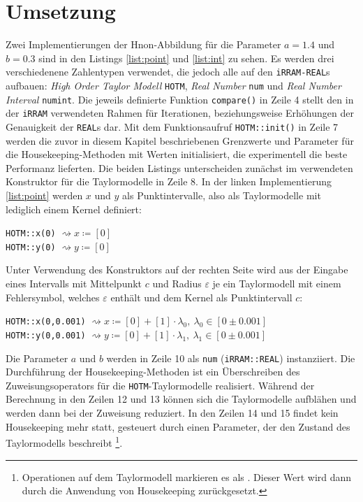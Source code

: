  \chapter{Umsetzung}  
 Zwei Implementierungen der H\e non-Abbildung für die Parameter $a=1.4$ und $b=0.3$ sind in den Listings \ref{list:point} und \ref{list:int} zu sehen. Es werden drei verschiedenene Zahlentypen verwendet, die jedoch alle auf den \verb+iRRAM-REAL+s aufbauen: \textit{High Order Taylor Modell} \verb+HOTM+, \textit{Real Number} \verb+num+ und \textit{Real Number Interval} \verb+numint+. Die jeweils definierte Funktion \verb+compare()+ in Zeile 4 stellt den in der \verb+iRRAM+ verwendeten Rahmen für Iterationen, beziehungsweise Erhöhungen der Genauigkeit der \verb+REAL+s dar. Mit dem Funktionsaufruf \verb+HOTM::init()+ in Zeile 7 werden die zuvor in diesem Kapitel beschriebenen Grenzwerte und Parameter für die Housekeeping-Methoden mit Werten initialisiert, die experimentell die beste Performanz lieferten. Die beiden Listings unterscheiden zunächst im verwendeten Konstruktor für die Taylormodelle in Zeile 8. In der linken Implementierung \ref{list:point} werden $x$ und $y$ als Punktintervalle, also als Taylormodelle mit lediglich einem Kernel definiert:
  \begin{center}
  \verb+HOTM::x(0)+ $\rightsquigarrow x\coloneqq [0]$\\
  \verb+HOTM::y(0)+ $\rightsquigarrow y\coloneqq [0]$
 \end{center}

 
 Unter Verwendung des Konstruktors auf der rechten Seite wird aus der Eingabe eines Intervalls mit Mittelpunkt $c$ und Radius $\varepsilon$ je ein Taylormodell mit einem Fehlersymbol, welches $\varepsilon$ enthält und dem Kernel als Punktintervall $c$: 
 \begin{center}
  \verb+HOTM::x(0,0.001)+ $\rightsquigarrow x\coloneqq [0] + [1] \cdot \lambda_0,\ \lambda_0 \in [0 \pm 0.001]$\\
  \verb+HOTM::y(0,0.001)+ $\rightsquigarrow y\coloneqq[0] + [1] \cdot \lambda_1,\ \lambda_1 \in [0 \pm 0.001]$
 \end{center}

Die Parameter $a$ und $b$ werden in Zeile 10 als \verb+num+ (\verb+iRRAM::REAL+) instanziiert. Die Durchführung der Housekeeping-Methoden ist ein Überschreiben des Zuweisungsoperators \anf{=} für die \verb+HOTM+-Taylormodelle realisiert. Während der Berechnung in den Zeilen 12 und 13 können sich die Taylormodelle aufblähen und werden dann bei der Zuweisung reduziert. In den Zeilen 14 und 15 findet kein Housekeeping mehr statt, gesteuert durch einen Parameter, der den Zustand des Taylormodells beschreibt \footnote{Operationen auf dem Taylormodell markieren es als . Dieser Wert wird dann durch die Anwendung von Housekeeping zurückgesetzt.}.

